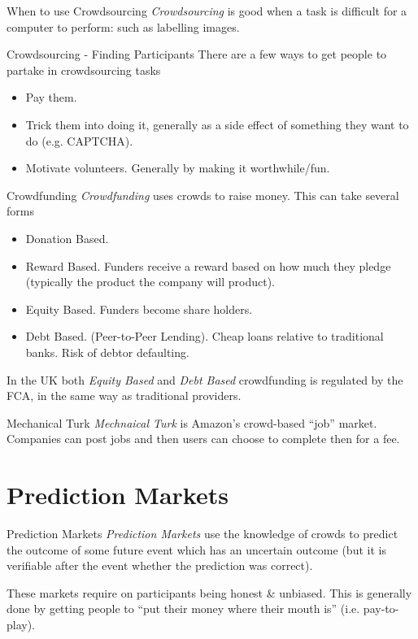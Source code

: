 \documentclass[11pt,a4paper]{article}
\begin{document}
\begin{proposition}{When to use Crowdsourcing}
  \textit{Crowdsourcing} is good when a task is difficult for a computer to perform: such as labelling images.
\end{proposition}

\begin{proposition}{Crowdsourcing - Finding Participants}
  There are a few ways to get people to partake in crowdsourcing tasks
  \begin{itemize}
    \item Pay them.
    \item Trick them into doing it, generally as a side effect of something they want to do (e.g. CAPTCHA).
    \item Motivate volunteers. Generally by making it worthwhile/fun.
  \end{itemize}
\end{proposition}

\begin{definition}{Crowdfunding}
  \textit{Crowdfunding} uses crowds to raise money. This can take several forms
  \begin{itemize}
    \item Donation Based.
    \item Reward Based. Funders receive a reward based on how much they pledge (typically the product the company will product).
    \item Equity Based. Funders become share holders.
    \item Debt Based. (Peer-to-Peer Lending). Cheap loans relative to traditional banks. Risk of debtor defaulting.
  \end{itemize}
  In the UK both \textit{Equity Based} and \textit{Debt Based} crowdfunding is regulated by the FCA, in the same way as traditional providers.
\end{definition}

\begin{definition}{Mechanical Turk}
  \textit{Mechnaical Turk} is Amazon's crowd-based ``job'' market. Companies can post jobs and then users can choose to complete then for a fee.
\end{definition}

\section{Prediction Markets}

\begin{definition}{Prediction Markets}
  \textit{Prediction Markets} use the knowledge of crowds to predict the outcome of some future event which has an uncertain outcome (but it is verifiable after the event whether the prediction was correct).
  \par These markets require on participants being honest \& unbiased. This is generally done by getting people to ``put their money where their mouth is'' (i.e. pay-to-play).
\end{definition}
\end{document}
